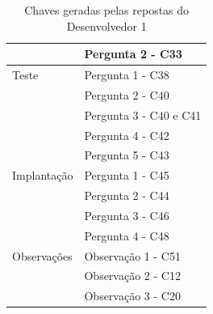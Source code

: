 \begin{table}[h]
\begin{tabular}{|m{4.8cm} | m{4.8cm} |}
		& Pergunta 2 - C33 \\ \cline{2-2}
		\hline
		Teste & Pergunta 1 - C38 \\ \cline{2-2}
		& Pergunta 2 - C40 \\ \cline{2-2}
		& Pergunta 3 - C40 e C41 \\ \cline{2-2}
		& Pergunta 4 - C42 \\ \cline{2-2}
		& Pergunta 5 - C43 \\ \cline{2-2}
		\hline
		Implantação & Pergunta 1 - C45 \\ \cline{2-2}
		& Pergunta 2 - C44 \\ \cline{2-2}
		& Pergunta 3 - C46 \\ \cline{2-2}
		& Pergunta 4 - C48 \\ \cline{2-2}
		\hline
		Observações & Observação 1 - C51 \\ \cline{2-2} 
		& Observação 2 - C12 \\ \cline{2-2} 
		& Observação 3 - C20 \\
		\hline
	\end{tabular}

	\caption{Chaves geradas pelas repostas do Desenvolvedor 1}
	\label{tab03}
\end{table}

